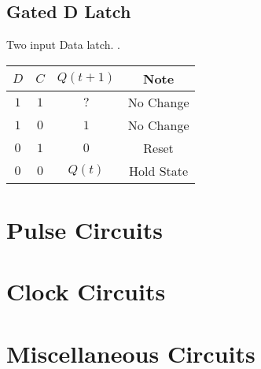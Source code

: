 \documentclass[12pt]{article}
\begin{document}
\subsection{Gated D Latch}
Two input Data latch. . \bigskip\\
\begin{tabular}{|c|c|c|c|}\hline
$D$ & $C$ & $Q(t+1)$ & Note\\\hline
$1$ & $1$ & $?$ & No Change\\\hline
$1$ & $0$ & $1$ & No Change\\\hline
$0$ & $1$ & $0$ & Reset\\\hline
$0$ & $0$ & $Q(t)$ & Hold State\\\hline
\end{tabular}

\section{Pulse Circuits}

\section{Clock Circuits}

\section{Miscellaneous Circuits}
\pagebreak
\end{document}
